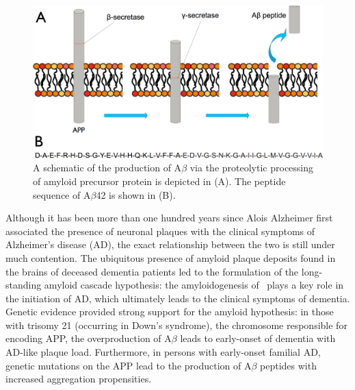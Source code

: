 \begin{figure}
\centering
\includegraphics[width=6in]{figures/introduction/AD_abeta_app.pdf}
\caption[APP processing]{A schematic of the production of A$\beta$ via the proteolytic processing of amyloid precursor protein is depicted in (A). The peptide sequence of A$\beta$42 is shown in (B).}
\label{fig:AD_abeta_app}
\end{figure}

Although it has been more than one hundred years since Alois Alzheimer first associated the presence of neuronal plaques with the clinical symptoms of Alzheimer's disease (AD), the exact relationship between the two is still under much contention.\cite{Hardy:2002dh} The ubiquitous presence of amyloid plaque deposits found in the brains of deceased dementia patients led to the formulation of the long-standing amyloid cascade hypothesis: the amyloidogenesis of \abeta\ plays a key role in the initiation of AD, which ultimately leads to the clinical symptoms of dementia.\cite{Hardy:2002dh} Genetic evidence provided strong support for the amyloid hypothesis: in those with trisomy 21 (occurring in Down's syndrome), the chromosome responsible for encoding APP,  the overproduction of A$\beta$ leads to early-onset of dementia with AD-like plaque load.\cite{Goate:1991kc,LevyLahad:1995vga} Furthermore, in persons with early-onset familial AD, genetic mutations on the APP lead to the production of A$\beta$ peptides with increased aggregation propensities.\cite{Tam:2012vz}

